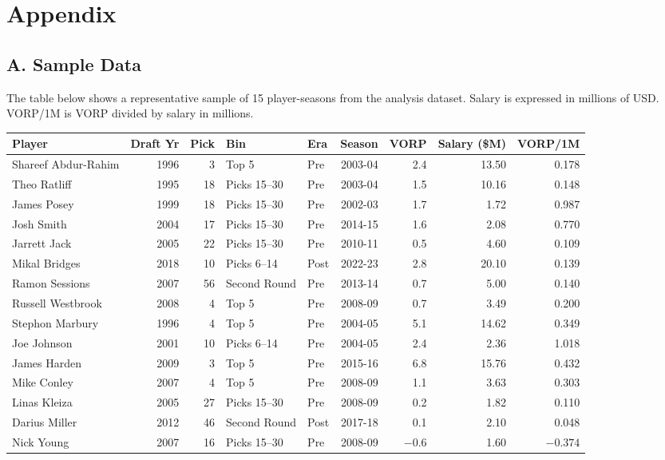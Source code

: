 \documentclass[12pt,letterpaper]{article}
\begin{document}
\section*{Appendix}

\subsection*{A. Sample Data}

The table below shows a representative sample of 15 player-seasons from the analysis dataset. Salary is expressed in millions of USD. VORP/1M is VORP divided by salary in millions.

\begin{center}
\footnotesize
\setlength{\tabcolsep}{4pt}
\begin{tabular}{@{}lrrllrrrr@{}}
\toprule
\textbf{Player} & \textbf{Draft Yr} & \textbf{Pick} & \textbf{Bin} & \textbf{Era} & \textbf{Season} & \textbf{VORP} & \textbf{Salary (\$M)} & \textbf{VORP/1M} \\
\midrule
Shareef Abdur-Rahim & 1996 & 3  & Top 5        & Pre  & 2003-04 & 2.4  & 13.50 & 0.178  \\
Theo Ratliff        & 1995 & 18 & Picks 15--30 & Pre  & 2003-04 & 1.5  & 10.16 & 0.148  \\
James Posey         & 1999 & 18 & Picks 15--30 & Pre  & 2002-03 & 1.7  & 1.72  & 0.987  \\
Josh Smith          & 2004 & 17 & Picks 15--30 & Pre  & 2014-15 & 1.6  & 2.08  & 0.770  \\
Jarrett Jack        & 2005 & 22 & Picks 15--30 & Pre  & 2010-11 & 0.5  & 4.60  & 0.109  \\
Mikal Bridges       & 2018 & 10 & Picks 6--14  & Post & 2022-23 & 2.8  & 20.10 & 0.139  \\
Ramon Sessions      & 2007 & 56 & Second Round & Pre  & 2013-14 & 0.7  & 5.00  & 0.140  \\
Russell Westbrook   & 2008 & 4  & Top 5        & Pre  & 2008-09 & 0.7  & 3.49  & 0.200  \\
Stephon Marbury     & 1996 & 4  & Top 5        & Pre  & 2004-05 & 5.1  & 14.62 & 0.349  \\
Joe Johnson         & 2001 & 10 & Picks 6--14  & Pre  & 2004-05 & 2.4  & 2.36  & 1.018  \\
James Harden        & 2009 & 3  & Top 5        & Pre  & 2015-16 & 6.8  & 15.76 & 0.432  \\
Mike Conley         & 2007 & 4  & Top 5        & Pre  & 2008-09 & 1.1  & 3.63  & 0.303  \\
Linas Kleiza        & 2005 & 27 & Picks 15--30 & Pre  & 2008-09 & 0.2  & 1.82  & 0.110  \\
Darius Miller       & 2012 & 46 & Second Round & Post & 2017-18 & 0.1  & 2.10  & 0.048  \\
Nick Young          & 2007 & 16 & Picks 15--30 & Pre  & 2008-09 & $-0.6$ & 1.60 & $-0.374$ \\
\bottomrule
\end{tabular}
\end{center}
\end{document}
